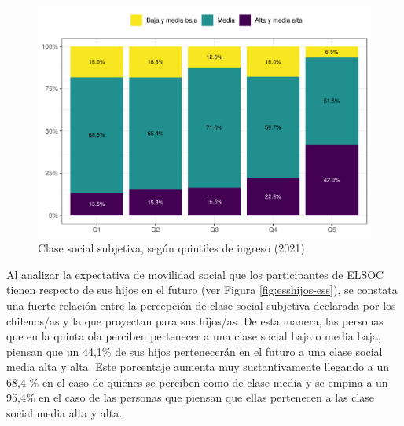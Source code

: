\documentclass[
  12pt,
]{book}
\begin{document}
\begin{figure}

{\centering \includegraphics{reporte-elsoc_files/figure-latex/ess-quintil-1} 

}

\caption{Clase social subjetiva, según quintiles de ingreso (2021)}\label{fig:ess-quintil}
\end{figure}

Al analizar la expectativa de movilidad social que los participantes de ELSOC tienen respecto de sus hijos en el futuro (ver Figura \ref{fig:esshijos-ess}), se constata una fuerte relación entre la percepción de clase social subjetiva declarada por los chilenos/as y la que proyectan para sus hijos/as. De esta manera, las personas que en la quinta ola perciben pertenecer a una clase social baja o media baja, piensan que un 44,1\% de sus hijos pertenecerán en el futuro a una clase social media alta y alta. Este porcentaje aumenta muy sustantivamente llegando a un 68,4 \% en el caso de quienes se perciben como de clase media y se empina a un 95,4\% en el caso de las personas que piensan que ellas pertenecen a las clase social media alta y alta.
\end{document}

